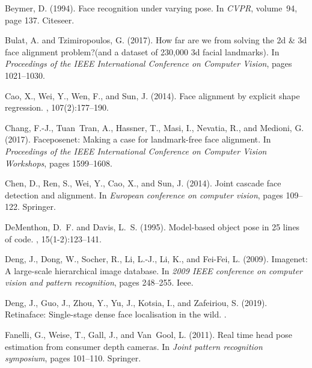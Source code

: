 \documentclass[a4paper,twoside]{article}
\begin{document}

{\small \begin{thebibliography}{}

Beymer, D. (1994).
\newblock Face recognition under varying pose.
\newblock In {\em CVPR}, volume~94, page 137. Citeseer.

Bulat, A. and Tzimiropoulos, G. (2017).
\newblock How far are we from solving the 2d \& 3d face alignment problem?(and
  a dataset of 230,000 3d facial landmarks).
\newblock In {\em Proceedings of the IEEE International Conference on Computer
  Vision}, pages 1021--1030.

Cao, X., Wei, Y., Wen, F., and Sun, J. (2014).
\newblock Face alignment by explicit shape regression.
, 107(2):177--190.

Chang, F.-J., Tuan~Tran, A., Hassner, T., Masi, I., Nevatia, R., and Medioni,
  G. (2017).
\newblock Faceposenet: Making a case for landmark-free face alignment.
\newblock In {\em Proceedings of the IEEE International Conference on Computer
  Vision Workshops}, pages 1599--1608.

Chen, D., Ren, S., Wei, Y., Cao, X., and Sun, J. (2014).
\newblock Joint cascade face detection and alignment.
\newblock In {\em European conference on computer vision}, pages 109--122.
  Springer.

DeMenthon, D.~F. and Davis, L.~S. (1995).
\newblock Model-based object pose in 25 lines of code.
, 15(1-2):123--141.

Deng, J., Dong, W., Socher, R., Li, L.-J., Li, K., and Fei-Fei, L. (2009).
\newblock Imagenet: A large-scale hierarchical image database.
\newblock In {\em 2009 IEEE conference on computer vision and pattern
  recognition}, pages 248--255. Ieee.

Deng, J., Guo, J., Zhou, Y., Yu, J., Kotsia, I., and Zafeiriou, S. (2019).
\newblock Retinaface: Single-stage dense face localisation in the wild.
.

Fanelli, G., Weise, T., Gall, J., and Van~Gool, L. (2011).
\newblock Real time head pose estimation from consumer depth cameras.
\newblock In {\em Joint pattern recognition symposium}, pages 101--110.
  Springer.


\end{thebibliography}}
\end{document}
